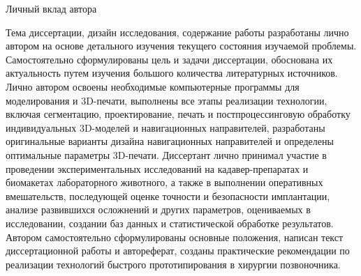 

     Личный вклад автора


     Тема диссертации, дизайн исследования, содержание работы разработаны
лично автором на основе детального изучения текущего состояния изучаемой
проблемы. Самостоятельно сформулированы цель и задачи диссертации,
обоснована их актуальность путем изучения большого количества литературных
источников. Лично автором освоены необходимые компьютерные программы для
моделирования и 3D-печати, выполнены все этапы реализации технологии,
включая сегментацию, проектирование, печать и постпроцессинговую обработку
индивидуальных 3D-моделей и навигационных направителей, разработаны
оригинальные варианты дизайна навигационных направителей и определены
оптимальные параметры 3D-печати. Диссертант лично принимал участие в
проведении   экспериментальных    исследований   на   кадавер-препаратах   и
биомакетах лабораторного животного, а также в выполнении оперативных
вмешательств, последующей оценке точности и безопасности имплантации,
анализе развившихся осложнений и других параметров, оцениваемых в
исследовании, создании баз данных и статистической обработке результатов.
Автором самостоятельно сформулированы основные положения, написан текст
диссертационной работы и автореферат, созданы практические рекомендации по
реализации технологий быстрого прототипирования в хирургии позвоночника.



